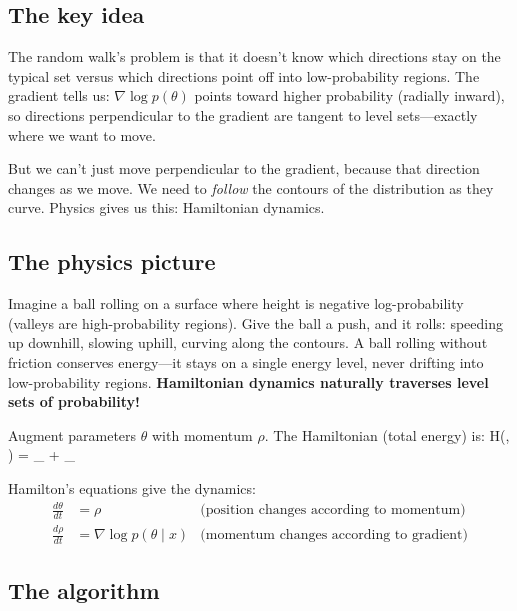 \documentclass[11pt]{article}
\begin{document}
\subsection{The key idea}

The random walk's problem is that it doesn't know which directions stay on the typical set versus which directions point off into low-probability regions. The gradient tells us: $\nabla \log p(\theta)$ points toward higher probability (radially inward), so directions perpendicular to the gradient are tangent to level sets---exactly where we want to move.

But we can't just move perpendicular to the gradient, because that direction changes as we move. We need to \emph{follow} the contours of the distribution as they curve. Physics gives us this: Hamiltonian dynamics.

\subsection{The physics picture}

Imagine a ball rolling on a surface where height is negative log-probability (valleys are high-probability regions). Give the ball a push, and it rolls: speeding up downhill, slowing uphill, curving along the contours. A ball rolling without friction conserves energy---it stays on a single energy level, never drifting into low-probability regions. \textbf{Hamiltonian dynamics naturally traverses level sets of probability!}

Augment parameters $\theta$ with momentum $\rho$. The Hamiltonian (total energy) is:
\beq
H(\theta, \rho) = _{} + _{}
\eeq

Hamilton's equations give the dynamics:
\begin{align}
\frac{d\theta}{dt} &= \rho & \text{(position changes according to momentum)}\\
\frac{d\rho}{dt} &= \nabla \log p(\theta \mid x) & \text{(momentum changes according to gradient)}
\end{align}

\subsection{The algorithm}
\end{document}
